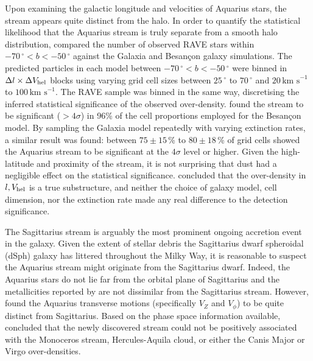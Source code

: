 \documentclass{emulateapj}
\begin{document}
Upon examining the galactic longitude and velocities of Aquarius stars, the stream appears quite distinct from the halo. In order to quantify the statistical likelihood that the Aquarius stream is truly separate from a smooth halo distribution, \citet{williams;et-al_2011} compared the number of observed RAVE stars within $-70\,^\circ < b < -50\,^\circ$ against the Galaxia \citep{sharma;et-al_2011} and Besan\c{c}on \citep{robin;et-al_2003} galaxy simulations. The predicted particles in each model between $-70\,^\circ < b < -50\,^\circ$ were binned in $\Delta{l} \times \Delta{V_{\rm hel}}$ blocks using varying grid cell sizes between $25\,^\circ$ to $70\,^\circ$ and $20\,\mbox{km s}^{-1}$ to $100\,\mbox{km s}^{-1}$. The RAVE sample was binned in the same way, discretising the inferred statistical significance of the observed over-density. \citet{williams;et-al_2011} found the stream to be significant ($>4\sigma$) in 96\% of the cell proportions employed for the Besan\c{c}on model. By sampling the Galaxia model repeatedly with varying extinction rates, a similar result was found: between $75\pm15$\,\% to $80\pm18$\,\% of grid cells showed the Aquarius stream to be significant at the $4\sigma$ level or higher. Given the high-latitude and proximity of the stream, it is not surprising that dust had a negligible effect on the statistical significance. \citet{williams;et-al_2011} concluded that the over-density in $l, V_{\rm hel}$ is a true substructure, and neither the choice of galaxy model, cell dimension, nor the extinction rate made any real difference to the detection significance.




The Sagittarius stream is arguably the most prominent ongoing accretion event in the galaxy. Given the extent of stellar debris the Sagittarius dwarf spheroidal (dSph) galaxy has littered throughout the Milky Way, it is reasonable to suspect the Aquarius stream might originate from the Sagittarius dwarf. Indeed, the Aquarius  stars do not lie far from the orbital plane of Sagittarius and the metallicities reported by \citet{williams;et-al_2011} are not dissimilar from the Sagittarius stream. However, \citet{williams;et-al_2011} found the Aquarius transverse motions (specifically $V_{Z}$ and $V_\phi$) to be quite distinct from Sagittarius. Based on the phase space information available, \citet{williams;et-al_2011} concluded that the newly discovered stream could not be positively associated with the Monoceros stream, Hercules-Aquila cloud, or either the Canis Major or Virgo over-densities. 
\end{document}
